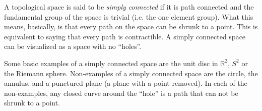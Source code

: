 \documentclass{article}
\begin{document}
A topological space is said to be \emph{simply connected} if it is path connected and the fundamental group of the space is trivial (i.e. the one element group).  What this means, basically, is that every path on the space can be shrunk to a point.  This is equivalent to saying that every path is contractible.  A simply connected space can be visualized as a space with no ``holes''.

Some basic examples of a simply connected space are the unit disc in $\mathbb{R}^2$, $S^2$ or the Riemann sphere.  Non-examples of a simply connected space are the circle, the annulus, and a punctured plane (a plane with a point removed).  In each of the non-examples, any closed curve around the ``hole'' is a path that can not be shrunk to a point.
\end{document}
